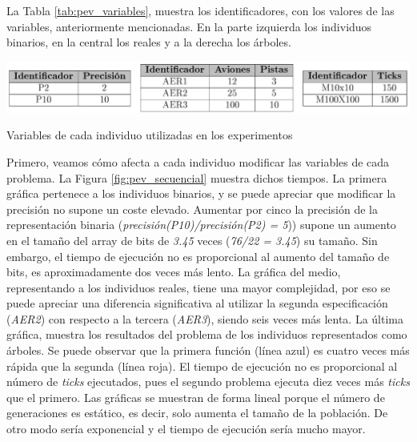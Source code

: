 La Tabla \ref{tab:pev_variables}, muestra los identificadores, con los valores de las variables, anteriormente mencionadas. En la parte izquierda los individuos binarios, en la central los reales y a la derecha los árboles.

\begin{table}[!h]
	\centering
	\includegraphics[width=1\textwidth]{images/chapter_4/tab_pev_variables}		
	\caption{Variables de cada individuo utilizadas en los experimentos}
	\label{tab:pev_variables}
\end{table}		


Primero, veamos cómo afecta a cada individuo modificar las variables de cada problema. La Figura \ref{fig:pev_secuencial} muestra dichos tiempos. La primera gráfica pertenece a los individuos binarios, y se puede apreciar que modificar la precisión no supone un coste elevado. Aumentar por cinco la precisión de la representación binaria (\textit{precisión(P10)/precisión(P2) = 5})) supone un aumento en el tamaño del array de bits de \textit{3.45} veces (\textit{76/22 = 3.45}) su tamaño. Sin embargo, el tiempo de ejecución no es proporcional al aumento del tamaño de bits, es aproximadamente dos veces más lento.	La gráfica del medio, representando a los individuos reales, tiene una mayor complejidad, por eso se puede apreciar una diferencia significativa al utilizar la segunda especificación (\textit{AER2}) con respecto a la tercera (\textit{AER3}), siendo seis veces más lenta. La última gráfica, muestra los resultados del problema de los individuos representados como árboles. Se puede observar que la primera función (línea azul) es cuatro veces más rápida que la segunda (línea roja). El tiempo de ejecución no es proporcional al número de \textit{ticks} ejecutados, pues el segundo problema ejecuta diez veces más \textit{ticks} que el primero. Las gráficas se muestran de forma lineal porque el número de generaciones es estático, es decir, solo aumenta el tamaño de la población. De otro modo sería exponencial y el tiempo de ejecución sería mucho mayor. 




